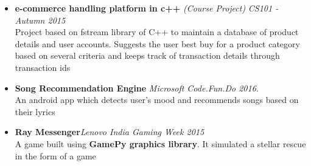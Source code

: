 \documentclass[a4paper,10pt]{article}
\begin{document}
\begin{itemize}
    \item \textbf{e-commerce handling platform in c++} \textit{(Course Project)} \hfill \textit{CS101 - Autumn 2015}\\
    Project based on fstream library of C++ to maintain a database of product details and user accounts. Suggests the user best buy for a product category based on several criteria and keeps track of transaction details through transaction ids
    \item \textbf{Song Recommendation Engine} \hfill \textit{Microsoft Code.Fun.Do 2016.}\\ An android app which detects user's mood and recommends songs based on their lyrics
    \item \textbf{Ray Messenger}\hfill\textit{Lenovo India Gaming Week 2015}\\A game built using \textbf{GamePy graphics library}. It simulated a stellar rescue in the form of a game
\end{itemize}
\end{document}
